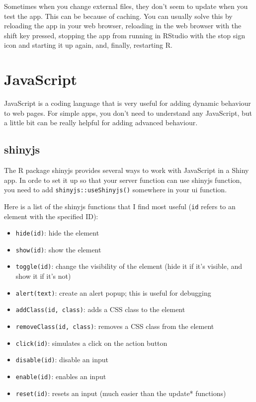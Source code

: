\documentclass[
]{book}
\providecommand{\tightlist}{%
  \setlength{\itemsep}{0pt}\setlength{\parskip}{0pt}}
\begin{document}
Sometimes when you change external files, they don't seem to update when you test the app. This can be because of caching. You can usually solve this by reloading the app in your web browser, reloading in the web browser with the shift key pressed, stopping the app from running in RStudio with the stop sign icon and starting it up again, and, finally, restarting R.

\hypertarget{javascript}{%
\section{JavaScript}\label{javascript}}

JavaScript is a coding language that is very useful for adding dynamic behaviour to web pages. For simple apps, you don't need to understand any JavaScript, but a little bit can be really helpful for adding advanced behaviour.

\hypertarget{shinyjs}{%
\subsection{shinyjs}\label{shinyjs}}

The R package shinyjs provides several ways to work with JavaScript in a Shiny app. In orde to set it up so that your server function can use shinyjs function, you need to add \texttt{shinyjs::useShinyjs()} somewhere in your ui function.

Here is a list of the shinyjs functions that I find most useful (\texttt{id} refers to an element with the specified ID):

\begin{itemize}
\tightlist
\item
  \texttt{hide(id)}: hide the element
\item
  \texttt{show(id)}: show the element
\item
  \texttt{toggle(id)}: change the visibility of the element (hide it if it's visible, and show it if it's not)
\item
  \texttt{alert(text)}: create an alert popup; this is useful for debugging
\item
  \texttt{addClass(id,\ class)}: adds a CSS class to the element
\item
  \texttt{removeClass(id,\ class)}: removes a CSS class from the element
\item
  \texttt{click(id)}: simulates a click on the action button
\item
  \texttt{disable(id)}: disable an input
\item
  \texttt{enable(id)}: enables an input
\item
  \texttt{reset(id)}: resets an input (much easier than the update* functions)
\end{itemize}
\end{document}
